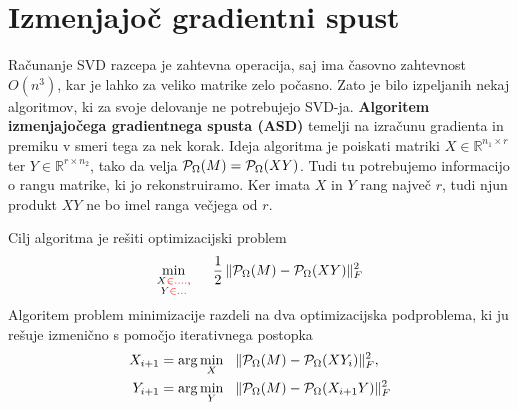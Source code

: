 \section{Izmenjajoč gradientni spust}
Računanje SVD razcepa je zahtevna operacija, saj ima časovno zahtevnost
$O(n^3)$, kar je lahko za veliko matrike zelo počasno. Zato je bilo izpeljanih nekaj algoritmov, ki za svoje delovanje ne potrebujejo SVD-ja. \textbf{Algoritem izmenjajočega gradientnega spusta (ASD)} \cite{AST-TK15} 
temelji na izračunu gradienta in premiku
v smeri tega za nek korak. Ideja algoritma je poiskati matriki $X \in \mathbb{R}^{n_1 \times r}$ ter $Y \in \mathbb{R}^{r \times n_2}$, tako da velja $\mathcal{P}_\Omega(M) = \mathcal{P}_\Omega(XY)$. Tudi tu potrebujemo informacijo o rangu matrike, ki jo rekonstruiramo. Ker imata $X$ in $Y$ rang največ $r$, tudi njun produkt $XY$ ne bo imel ranga večjega od $r$. 

Cilj algoritma je rešiti optimizacijski problem
\[
    \min_{\substack{X\CR{\in ....}, \\Y\CR{\in...}}} \hspace{0.5cm} \frac{1}{2}\, \fnorm{\proj(M) - \proj(XY)}^2
\] 
Algoritem problem minimizacije razdeli na dva optimizacijska podproblema, ki ju rešuje izmenično s pomočjo iterativnega postopka
\begin{align}
\label{2507-0927}
    X_{i+1} &= \arg \min_{X} \hspace{0.3cm} \lVert\mathcal{P}_\Omega(M) - \mathcal{P}_\Omega(XY_i)\rVert_F^2, \\
\label{2507-0928}
    Y_{i+1} &= \arg \min_{Y} \hspace{0.3cm} \lVert\mathcal{P}_\Omega(M) - \mathcal{P}_\Omega(X_{i+1}Y)\rVert_F^2
\end{align}



